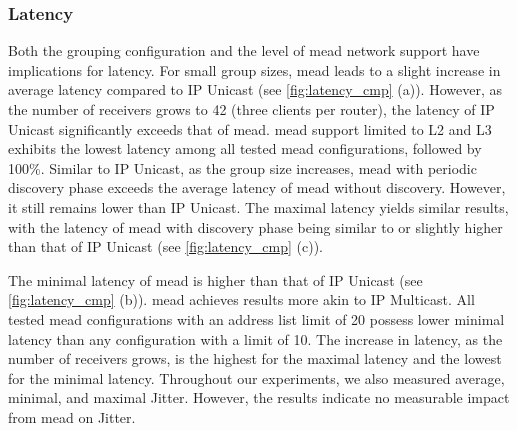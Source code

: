 \subsubsection{Latency}
Both the grouping configuration and the level of \gls{mead} network support
    have implications for latency.
For small group sizes, \gls{mead} leads to a slight increase in average latency
    compared to IP Unicast (see \autoref{fig:latency_cmp} (a)).
However, as the number of receivers grows to 42 (three clients per router), the
    latency of IP Unicast significantly exceeds that of \gls{mead}.
\gls{mead} support limited to L2 and L3 exhibits the lowest latency among all
    tested \gls{mead} configurations, followed by 100\%.
Similar to IP Unicast, as the group size increases, \gls{mead} with periodic
    discovery phase exceeds the average latency of \gls{mead} without discovery.
However, it still remains lower than IP Unicast.
The maximal latency yields similar results, with the latency of \gls{mead} with
    discovery phase being similar to or slightly higher than that of IP Unicast
    (see \autoref{fig:latency_cmp} (c)).

The minimal latency of \gls{mead} is higher than that of IP Unicast (see
    \autoref{fig:latency_cmp} (b)).
\gls{mead} achieves results more akin to IP Multicast.
All tested \gls{mead} configurations with an address list limit of 20 possess
    lower minimal latency than any configuration with a limit of 10.
The increase in latency, as the number of receivers grows, is the highest for
    the maximal latency and the lowest for the minimal latency.
Throughout our experiments, we also measured average, minimal, and maximal
    Jitter.
However, the results indicate no measurable impact from \gls{mead} on Jitter.

